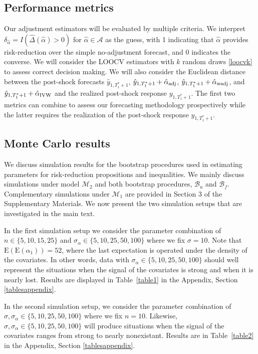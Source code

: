 \documentclass[11pt,3p,review,authoryear]{elsarticle}
\def\mc#1{\mathcal{#1}} %
\def\E#1{\mathrm{E}(#1)} %
\theoremstyle{definition}
\begin{document}
\subsection{Performance metrics}

Our adjustment estimators will be evaluated by multiple criteria. We interpret $\delta_{\hat{\alpha}}= I(\hat{\Delta}(\hat{\alpha})>0)$ for $\hat{\alpha}\in \mc{A}$ as the guess, with 1 indicating that $\hat{\alpha}$ provides risk-reduction over the simple no-adjustment forecast, and 0 indicates the converse. We will consider the LOOCV estimators with $k$ random draws \eqref{loocvk} to assess correct decision making. We will also consider the Euclidean distance between the post-shock forecasts $\hat{y}_{1,T_1^*+1}$, $\hat{y}_{1,T_1^*+1}+ \hat{\alpha}_{\rm adj}$, $\hat{y}_{1,T_1^*+1}+\hat{\alpha}_{\rm wadj}$, and $\hat{y}_{1,T_1^*+1}+\hat{\alpha}_{\rm IVW}$ and the realized post-shock response $y_{1,T_1^*+1}$. The first two metrics can combine to assess our forecasting methodology prospectively while the latter requires the realization of the post-shock response $y_{1,T_1^*+1}$. 



\subsection{Monte Carlo results}
\label{parametricbootstrapsimulation}

We discuss simulation results for the bootstrap procedures used in estimating parameters for risk-reduction propositions and inequalities. We mainly discuss simulations under model $\mc{M}_2$ and both bootstrap procedures, $\mc{B}_u$ and $\mc{B}_f$. Complementary simulations under $\mc{M}_1$ are provided in Section 3 of the Supplementary Materials. We now present the two simulation setups that are investigated in the main text. 

In the first simulation setup we consider the parameter combination of  $n \in \{5, 10, 15, 25\}$ and $\sigma_{\alpha} \in  \{5, 10, 25, 50, 100\}$ where we fix $\sigma=10$. Note that $\E{\E{\alpha_1}}=52$, where the last expectation is operated under the density of the covariates. In other words, data with $\sigma_{\alpha} \in  \{5, 10, 25, 50, 100\}$  should well represent the situations when the signal of the covariates is strong and when it is nearly lost. Results are displayed in Table~\ref{table1} in the Appendix, Section \ref{tablesappendix}.

In the second simulation setup, we consider the parameter combination of $\sigma, \sigma_{\alpha} \in  \{5, 10, 25, 50, 100\}$ where we fix $n=10$. Likewise, $\sigma, \sigma_{\alpha} \in  \{5, 10, 25, 50, 100\}$ will produce situations when the signal of the covariates ranges from strong to nearly nonexistant. Results are  in Table~\ref{table2} in the Appendix, Section \ref{tablesappendix}.
\end{document}
